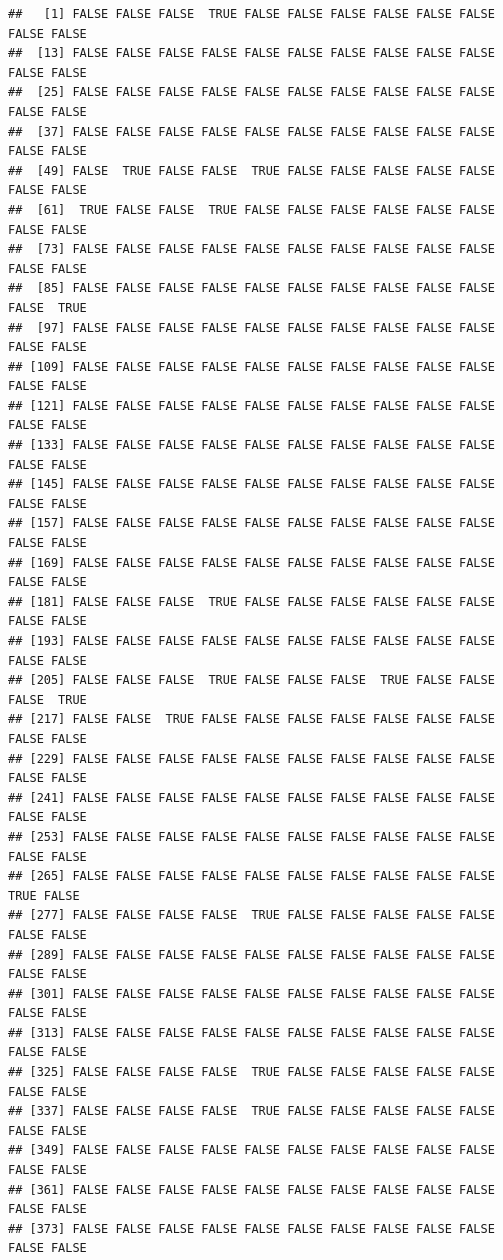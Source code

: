 \documentclass[
]{article}
\begin{document}
\begin{verbatim}
##   [1] FALSE FALSE FALSE  TRUE FALSE FALSE FALSE FALSE FALSE FALSE FALSE FALSE
##  [13] FALSE FALSE FALSE FALSE FALSE FALSE FALSE FALSE FALSE FALSE FALSE FALSE
##  [25] FALSE FALSE FALSE FALSE FALSE FALSE FALSE FALSE FALSE FALSE FALSE FALSE
##  [37] FALSE FALSE FALSE FALSE FALSE FALSE FALSE FALSE FALSE FALSE FALSE FALSE
##  [49] FALSE  TRUE FALSE FALSE  TRUE FALSE FALSE FALSE FALSE FALSE FALSE FALSE
##  [61]  TRUE FALSE FALSE  TRUE FALSE FALSE FALSE FALSE FALSE FALSE FALSE FALSE
##  [73] FALSE FALSE FALSE FALSE FALSE FALSE FALSE FALSE FALSE FALSE FALSE FALSE
##  [85] FALSE FALSE FALSE FALSE FALSE FALSE FALSE FALSE FALSE FALSE FALSE  TRUE
##  [97] FALSE FALSE FALSE FALSE FALSE FALSE FALSE FALSE FALSE FALSE FALSE FALSE
## [109] FALSE FALSE FALSE FALSE FALSE FALSE FALSE FALSE FALSE FALSE FALSE FALSE
## [121] FALSE FALSE FALSE FALSE FALSE FALSE FALSE FALSE FALSE FALSE FALSE FALSE
## [133] FALSE FALSE FALSE FALSE FALSE FALSE FALSE FALSE FALSE FALSE FALSE FALSE
## [145] FALSE FALSE FALSE FALSE FALSE FALSE FALSE FALSE FALSE FALSE FALSE FALSE
## [157] FALSE FALSE FALSE FALSE FALSE FALSE FALSE FALSE FALSE FALSE FALSE FALSE
## [169] FALSE FALSE FALSE FALSE FALSE FALSE FALSE FALSE FALSE FALSE FALSE FALSE
## [181] FALSE FALSE FALSE  TRUE FALSE FALSE FALSE FALSE FALSE FALSE FALSE FALSE
## [193] FALSE FALSE FALSE FALSE FALSE FALSE FALSE FALSE FALSE FALSE FALSE FALSE
## [205] FALSE FALSE FALSE  TRUE FALSE FALSE FALSE  TRUE FALSE FALSE FALSE  TRUE
## [217] FALSE FALSE  TRUE FALSE FALSE FALSE FALSE FALSE FALSE FALSE FALSE FALSE
## [229] FALSE FALSE FALSE FALSE FALSE FALSE FALSE FALSE FALSE FALSE FALSE FALSE
## [241] FALSE FALSE FALSE FALSE FALSE FALSE FALSE FALSE FALSE FALSE FALSE FALSE
## [253] FALSE FALSE FALSE FALSE FALSE FALSE FALSE FALSE FALSE FALSE FALSE FALSE
## [265] FALSE FALSE FALSE FALSE FALSE FALSE FALSE FALSE FALSE FALSE  TRUE FALSE
## [277] FALSE FALSE FALSE FALSE  TRUE FALSE FALSE FALSE FALSE FALSE FALSE FALSE
## [289] FALSE FALSE FALSE FALSE FALSE FALSE FALSE FALSE FALSE FALSE FALSE FALSE
## [301] FALSE FALSE FALSE FALSE FALSE FALSE FALSE FALSE FALSE FALSE FALSE FALSE
## [313] FALSE FALSE FALSE FALSE FALSE FALSE FALSE FALSE FALSE FALSE FALSE FALSE
## [325] FALSE FALSE FALSE FALSE  TRUE FALSE FALSE FALSE FALSE FALSE FALSE FALSE
## [337] FALSE FALSE FALSE FALSE  TRUE FALSE FALSE FALSE FALSE FALSE FALSE FALSE
## [349] FALSE FALSE FALSE FALSE FALSE FALSE FALSE FALSE FALSE FALSE FALSE FALSE
## [361] FALSE FALSE FALSE FALSE FALSE FALSE FALSE FALSE FALSE FALSE FALSE FALSE
## [373] FALSE FALSE FALSE FALSE FALSE FALSE FALSE FALSE FALSE FALSE FALSE FALSE

\end{verbatim}
\end{document}
